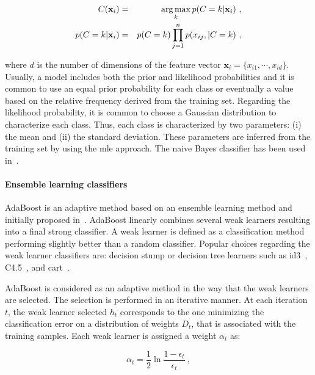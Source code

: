 \begin{eqnarray}
	C(\mathbf{x}_i) & = & \operatorname*{arg\,max}_k p(C=k|\mathbf{x}_i) \ , \label{eq:maxbay} \\
	p(C=k|\mathbf{x}_i) & = & p(C=k) \prod_{j=1}^{n} p(x_{ij},|C=k) \ , \label{eq:postbay}
\end{eqnarray}

\noindent where $d$ is the number of dimensions of the feature vector $\mathbf{x}_i = \{x_{i1},\cdots,x_{id}\}$.
Usually, a model includes both the prior and likelihood probabilities and it is common to use an equal prior probability for each class or eventually a value based on the relative frequency derived from the training set.
Regarding the likelihood probability, it is common to choose a Gaussian distribution to characterize each class.
Thus, each class is characterized by two parameters: (i) the mean and (ii) the standard deviation.
These parameters are inferred from the training set by using the \ac{mle} approach.
The naive Bayes classifier has been used in~\cite{Giannini2013,Mazzetti2011,Niaf2011,Niaf2012,Niaf2012,cameron2014multiparametric,cameron2016maps,rampun2015classifying,rampun2016computerb,rampun2015computer,rampun2016computer}.

\paragraph{Ensemble learning classifiers}
AdaBoost is an adaptive method based on an ensemble learning method and initially proposed in~\cite{Freund1997}. 
AdaBoost linearly combines several weak learners resulting into a final strong classifier.
A weak learner is defined as a classification method performing slightly better than a random classifier.
Popular choices regarding the weak learner classifiers are: decision stump or decision tree learners such as \ac{id3}~\cite{Quinlan1986}, C4.5~\cite{Quinlan1993}, and \ac{cart}~\cite{Breiman1984}.

AdaBoost is considered as an adaptive method in the way that the weak learners are selected.
The selection is performed in an iterative manner.
At each iteration $t$, the weak learner selected $h_t$ corresponds to the one minimizing the classification error on a distribution of weights $D_t$, that is associated with the training samples.
Each weak learner is assigned a weight $\alpha_t$ as:

\begin{equation}
	\alpha_t = \frac{1}{2} \ln \frac{1 - \epsilon_t}{\epsilon_t} \ ,
	\label{eq:wclssada}
\end{equation}

